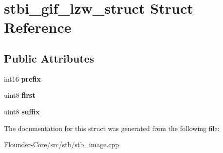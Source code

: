 \hypertarget{structstbi__gif__lzw__struct}{}\section{stbi\+\_\+gif\+\_\+lzw\+\_\+struct Struct Reference}
\label{structstbi__gif__lzw__struct}
\subsection*{Public Attributes}
\begin{DoxyCompactItemize}
\item 
\mbox{\label{structstbi__gif__lzw__struct_a0e5142cb4117b905eb9efd73c436525c}} 
int16 {\bfseries prefix}
\item 
\mbox{\label{structstbi__gif__lzw__struct_a08129c445d56c0983285d6e0e71b83bd}} 
uint8 {\bfseries first}
\item 
\mbox{\label{structstbi__gif__lzw__struct_a3ec7f462268018489345b79b2f123764}} 
uint8 {\bfseries suffix}
\end{DoxyCompactItemize}


The documentation for this struct was generated from the following file\+:\begin{DoxyCompactItemize}
\item 
Flounder-\/\+Core/src/stb/stb\+\_\+image.\+cpp\end{DoxyCompactItemize}
